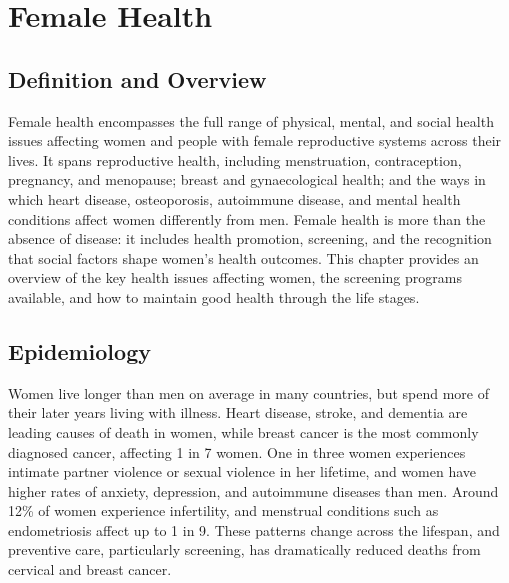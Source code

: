 \chapter{Female Health}

\section*{Definition and Overview}
Female health encompasses the full range of physical, mental, and social health issues affecting women and people with female reproductive systems across their lives. It spans reproductive health, including menstruation, contraception, pregnancy, and menopause; breast and gynaecological health; and the ways in which heart disease, osteoporosis, autoimmune disease, and mental health conditions affect women differently from men. Female health is more than the absence of disease: it includes health promotion, screening, and the recognition that social factors shape women's health outcomes. This chapter provides an overview of the key health issues affecting women, the screening programs available, and how to maintain good health through the life stages.

\section*{Epidemiology}
Women live longer than men on average in many countries, but spend more of their later years living with illness. Heart disease, stroke, and dementia are leading causes of death in women, while breast cancer is the most commonly diagnosed cancer, affecting 1 in 7 women. One in three women experiences intimate partner violence or sexual violence in her lifetime, and women have higher rates of anxiety, depression, and autoimmune diseases than men. Around 12\% of women experience infertility, and menstrual conditions such as endometriosis affect up to 1 in 9. These patterns change across the lifespan, and preventive care, particularly screening, has dramatically reduced deaths from cervical and breast cancer.

